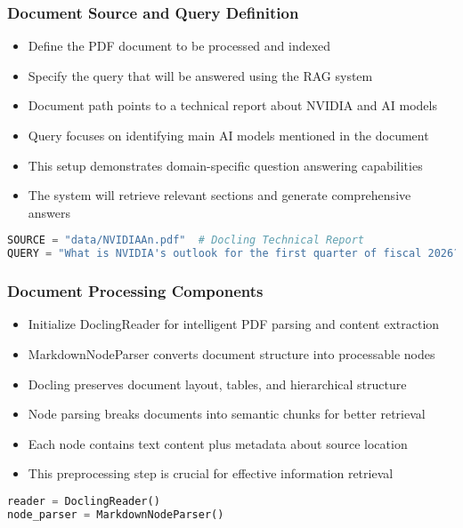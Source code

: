 \begin{frame}[fragile]\frametitle{Document Source and Query Definition}
      \begin{itemize}
          \item Define the PDF document to be processed and indexed
          \item Specify the query that will be answered using the RAG system
          \item Document path points to a technical report about NVIDIA and AI models
          \item Query focuses on identifying main AI models mentioned in the document
          \item This setup demonstrates domain-specific question answering capabilities
          \item The system will retrieve relevant sections and generate comprehensive answers
      \end{itemize}
      
\begin{lstlisting}[language=Python]
SOURCE = "data/NVIDIAAn.pdf"  # Docling Technical Report
QUERY = "What is NVIDIA's outlook for the first quarter of fiscal 2026?"
\end{lstlisting}
\end{frame}

\begin{frame}[fragile]\frametitle{Document Processing Components}
      \begin{itemize}
          \item Initialize DoclingReader for intelligent PDF parsing and content extraction
          \item MarkdownNodeParser converts document structure into processable nodes
          \item Docling preserves document layout, tables, and hierarchical structure
          \item Node parsing breaks documents into semantic chunks for better retrieval
          \item Each node contains text content plus metadata about source location
          \item This preprocessing step is crucial for effective information retrieval
      \end{itemize}
      
\begin{lstlisting}[language=Python]
reader = DoclingReader()
node_parser = MarkdownNodeParser()
\end{lstlisting}
\end{frame}

